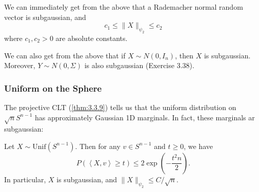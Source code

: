 \begin{example}[Rademacher]
\label{ex:3.4.3}
We can immediately get from the above that a Rademacher normal random vector is subgaussian, and 
\[ c_1 \leq \lVert X \rVert_{\psi_2} \leq c_2 \]
where $c_1, c_2 > 0$ are absolute constants.
\end{example}

\begin{example}[Normal]
\label{ex:3.4.4}
We can also get from the above that if $X \sim N(0, I_n)$, then $X$ is subgaussian. Moreover, 
$Y \sim N(0, \Sigma)$ is also subgaussian (Exercise 3.38).
\end{example}


\subsubsection{Uniform on the Sphere}
The projective CLT (\cref{thm:3.3.9}) tells us that the uniform distribution on $\sqrt{n}S^{n - 1}$ has 
approximately Gaussian 1D marginals. In fact, these marginals ar subgaussian:

\begin{theorem}
\label{thm:3.4.5}
Let $X \sim \mathrm{Unif}(S^{n - 1})$. Then for any $v \in S^{n - 1}$ and $t \geq 0$, we have 
\[ P(\left\langle X, v \right\rangle \geq t) \leq 2\exp{\left( -\frac{t^2 n}{2} \right)}. \]
In particular, $X$ is subgaussian, and $\lVert X \rVert_{\psi_2} \leq C / \sqrt{n}$.
\end{theorem}

